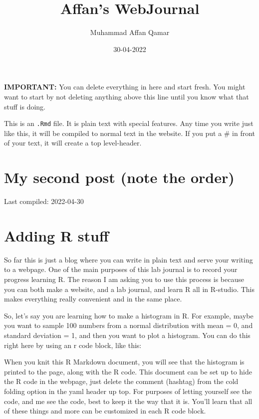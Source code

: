 \documentclass[
]{article}
\title{Affan's WebJournal}
\author{Muhammad Affan Qamar}
\date{30-04-2022}
\begin{document}
\maketitle

\textbf{IMPORTANT:} You can delete everything in here and start fresh.
You might want to start by not deleting anything above this line until
you know what that stuff is doing.

This is an \texttt{.Rmd} file. It is plain text with special features.
Any time you write just like this, it will be compiled to normal text in
the website. If you put a \# in front of your text, it will create a top
level-header.

\hypertarget{my-second-post-note-the-order}{%
\section{My second post (note the
order)}\label{my-second-post-note-the-order}}

Last compiled: 2022-04-30

\hypertarget{adding-r-stuff}{%
\section{Adding R stuff}\label{adding-r-stuff}}

So far this is just a blog where you can write in plain text and serve
your writing to a webpage. One of the main purposes of this lab journal
is to record your progress learning R. The reason I am asking you to use
this process is because you can both make a website, and a lab journal,
and learn R all in R-studio. This makes everything really convenient and
in the same place.

So, let's say you are learning how to make a histogram in R. For
example, maybe you want to sample 100 numbers from a normal distribution
with mean = 0, and standard deviation = 1, and then you want to plot a
histogram. You can do this right here by using an r code block, like
this:

When you knit this R Markdown document, you will see that the histogram
is printed to the page, along with the R code. This document can be set
up to hide the R code in the webpage, just delete the comment (hashtag)
from the cold folding option in the yaml header up top. For purposes of
letting yourself see the code, and me see the code, best to keep it the
way that it is. You'll learn that all of these things and more can be
customized in each R code block.
\end{document}
